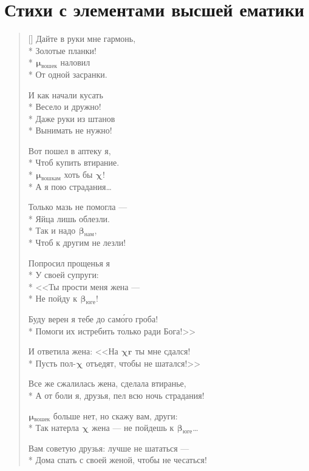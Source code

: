 \documentclass[a4paper,oneside,14pt]{scrbook}
\newcommand{\myMnd}[2]{$^{\text{#1}}${\large{$\boldsymbol{\mu}$}}$_{\text{#2}}$}
\newcommand{\myXyi}[2]{$^{\text{#1}}${\large{$\boldsymbol{\chi}$}}$_{\text{#2}}$}
\newcommand{\myXer}[2]{$^{\text{#1}}${\large{$\boldsymbol{\chi r}$}}$_{\text{#2}}$}
\newcommand{\myBld}[2]{$^{\text{#1}}${\large{$\boldsymbol{\beta}$}}$_{\text{#2}}$}
\begin{document}
    
    \chapter{Стихи с элементами высшей ематики}
    
    \settowidth{\versewidth}{Дома спать с своей женой, чтобы не чесаться!}
    \begin{verse}[\versewidth]
        Дайте в руки мне гармонь,\\*
        Золотые планки!\\*
        {\myMnd{}{вошек}} наловил\\*
        От одной засранки.
        
        \vin И как начали кусать\\*
        \vin Весело и дружно!\\*
        \vin Даже руки из штанов\\*
        \vin Вынимать не нужно!
        
        Вот пошел в аптеку я,\\*
        Чтоб купить втирание.\\*
        {\myMnd{}{вошкам}} хоть бы {\myXyi{}{}}!\\*
        А я пою страдания\ldots
        
        \vin Только мазь не помогла ---\\*
        \vin Яйца лишь облезли.\\*
        \vin Так и надо {\myBld{}{нам}},\\*
        \vin Чтоб к другим не лезли!
        
        Попросил прощенья я\\*
        У своей супруги:\\*
        <<Ты прости меня жена ---\\*
        Не пойду к {\myBld{}{юге}}!
        
        \vin Буду верен я тебе до сам\'{о}го гроба!\\*
        \vin Помоги их истребить только ради Бога!>>
        
        И ответила жена: <<На {\myXer{}{}} ты мне сдался!\\*
        Пусть пол-{\myXyi{}{}} отъедят, чтобы не шатался!>>
        
        \vin Все же сжалилась жена, сделала втиранье,\\*
        \vin А от боли я, друзья, пел всю ночь страдания!
        
        {\myMnd{}{вошек}} больше нет, но скажу вам, други:\\*
        Так натерла {\myXyi{}{}} жена --- не пойдешь к {\myBld{}{юге}}\ldots
        
        \vin Вам советую друзья: лучше не шататься ---\\*
        \vin Дома спать с своей женой, чтобы не чесаться!
    \end{verse}    
    
\end{document}
